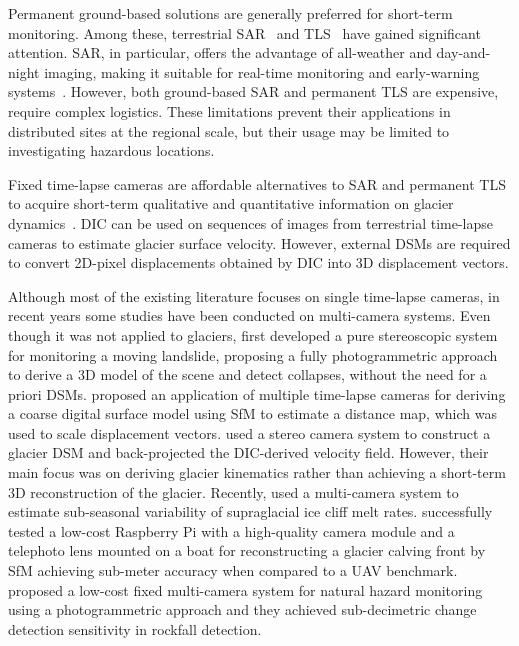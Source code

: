 Permanent ground-based solutions are generally preferred for short-term monitoring.
Among these, terrestrial SAR~\citep{Strozzi2020} and TLS~\citep{Hendrickx2022,Voordendag2023} have gained significant attention.
SAR, in particular, offers the advantage of all-weather and day-and-night imaging, making it suitable for real-time monitoring and early-warning systems~\citep{Dematteis2021, Noferini2009}.
However, both ground-based SAR and permanent TLS are expensive, require complex
logistics.
These limitations prevent their applications in distributed sites at the regional scale, but their usage may be limited to investigating hazardous locations.

Fixed time-lapse cameras are affordable alternatives to SAR and permanent TLS to acquire short-term qualitative and quantitative information on glacier dynamics~\citep{Giordan2016, James2016, Maas2006, Messerli2015}.
DIC can be used on sequences of images from terrestrial time-lapse cameras to estimate glacier surface velocity.
However, external DSMs are required to convert 2D-pixel displacements obtained by DIC into 3D displacement vectors.

Although most of the existing literature focuses on single time-lapse cameras, in recent
years some studies have been conducted on multi-camera systems.
Even though it was not applied to glaciers, \cite{roncella_landslide_2014} first
developed a pure stereoscopic system for monitoring a moving landslide, proposing a fully photogrammetric approach to derive a 3D model of the scene and detect collapses, without the need for a priori DSMs.
\cite{Schwalbe2017} proposed an application of multiple time-lapse cameras for deriving
a coarse digital surface model using SfM to estimate a distance
map, which was used to scale displacement vectors.
\cite{Marsy2020} used a stereo camera system to construct a glacier DSM and
back-projected the DIC-derived velocity field.
However, their main focus was on deriving glacier kinematics rather than achieving a
short-term 3D reconstruction of the glacier.
Recently, \cite{kneib_sub-seasonal_2022} used a multi-camera system to
estimate sub-seasonal variability of supraglacial ice cliff melt rates.
\cite{Taylor2023} successfully tested a low-cost Raspberry Pi with a high-quality camera
module and a telephoto lens mounted on a boat for reconstructing a glacier calving front
by SfM achieving sub-meter accuracy when compared to a UAV benchmark.
\cite{Blanch2023} proposed a low-cost fixed multi-camera system for natural hazard
monitoring using a photogrammetric approach and they achieved sub-decimetric change
detection sensitivity in rockfall detection.

